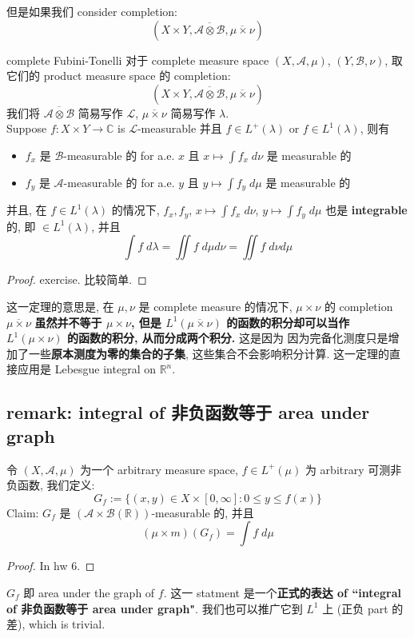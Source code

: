 \documentclass[lang=cn,11pt]{elegantbook}
\begin{document}
但是如果我们 consider completion: \[
(X \times Y , \overline{\mathcal{A} \otimes \mathcal{B}},  \overline{\mu \times \nu}   ) 
\]
\begin{theorem}{complete Fubini-Tonelli}
对于 complete measure space \((X, \mathcal{A}, \mu)\), $ (Y , \mathcal{B}, \nu)$, 取它们的 product measure space 的 completion: \[
(X \times Y , \overline{\mathcal{A} \otimes \mathcal{B}},  \overline{\mu \times \nu}   ) 
\]
我们将 $\overline{\mathcal{A} \otimes \mathcal{B}}$ 简易写作 $\mathcal{L}$, $\overline{\mu \times \nu}   $ 简易写作 $\lambda$.\\
Suppose $f: X \times Y \to \mathbb{C}$ is $\mathcal{L}$-measurable 并且 $f \in L^+(\lambda)$ or $f \in L^1(\lambda)$, 则有
\begin{itemize}
    \item $f_x$ 是 $\mathcal{B}$-measurable 的 for a.e. $x$ 且 $x \mapsto \int f_x \; d\nu$ 是 measurable 的
    \item $f_y$ 是 $\mathcal{A}$-measurable 的 for a.e. $y$ 且 $y \mapsto \int f_y \; d\mu$ 是 measurable 的
\end{itemize}
并且, 在 $f \in L^1(\lambda)$ 的情况下,  $f_x, f_y$, $x \mapsto \int f_x \; d\nu$, $y \mapsto \int f_y \; d\mu$ 也是 \textbf{integrable} 的, 即 $\in L^1(\lambda)$, 并且 \[
\int f \; d\lambda = \iint  f \; d\mu d\nu =  \iint  f \; d\nu d\mu 
\]
\end{theorem}
\begin{proof}
    exercise. 比较简单.
\end{proof}
\begin{remark}
    这一定理的意思是, 在 $\mu,\nu$ 是 complete measure 的情况下, $\mu \times \nu$ 的 completion  $\overline{\mu \times \nu}   $ \textbf{虽然并不等于 $\mu \times \nu$, 但是 $ L^1(\overline{\mu \times \nu})$ 的函数的积分却可以当作 $ L^1(\mu \times \nu)$ 的函数的积分, 从而分成两个积分.}
    这是因为 因为完备化测度只是增加了一些\textbf{原本测度为零的集合的子集}, 这些集合不会影响积分计算. 这一定理的直接应用是 Lebesgue integral on $\mathbb{R}^n$.
\end{remark}

\subsection{remark: integral of 非负函数等于 area under graph}
\begin{theorem}
    令 $(X,\mathcal{A}, \mu)$ 为一个 arbitrary measure space, $f \in L^+(\mu)$ 为 arbitrary 可测非负函数, 我们定义: \[
    G_f := \{(x,y) \in X \times [0,\infty] : 0 \leq y \leq f(x)\}
    \]
    Claim: $G_f$ 是 $(\mathcal{A}\times \mathcal{B}(\mathbb{R}))$-measurable 的, 并且 \[
    (\mu \times m) (G_f) = \int f \; d\mu
    \]
\end{theorem}
\begin{proof}
    In hw 6.
\end{proof}
\begin{remark}
$G_f$ 即 area under the graph of $f$. 这一 statment 是一个\textbf{正式的表达 of ``integral of 非负函数等于 area under graph"}. 我们也可以推广它到 $L^1$ 上 (正负 part 的差), which is trivial.
\end{remark}
\end{document}
